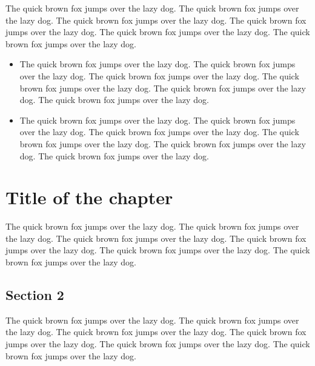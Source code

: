 \documentclass[11pt,a4paper]{report}
\begin{document}
The quick brown fox jumps over the lazy dog. The quick brown fox jumps over the lazy dog. The quick brown fox jumps over the lazy dog. The quick brown fox jumps over the lazy dog. The quick brown fox jumps over the lazy dog. The quick brown fox jumps over the lazy dog.

\begin{itemize}
    \item The quick brown fox jumps over the lazy dog. The quick brown fox jumps over the lazy dog. The quick brown fox jumps over the lazy dog. The quick brown fox jumps over the lazy dog. The quick brown fox jumps over the lazy dog. The quick brown fox jumps over the lazy dog.
    \item The quick brown fox jumps over the lazy dog. The quick brown fox jumps over the lazy dog. The quick brown fox jumps over the lazy dog. The quick brown fox jumps over the lazy dog. The quick brown fox jumps over the lazy dog. The quick brown fox jumps over the lazy dog.
\end{itemize}

\chapter{Title of the chapter}
\label{cap:name2}

The quick brown fox jumps over the lazy dog. The quick brown fox jumps over the lazy dog. The quick brown fox jumps over the lazy dog. The quick brown fox jumps over the lazy dog. The quick brown fox jumps over the lazy dog. The quick brown fox jumps over the lazy dog.

\section{Section 2}
\label{sec:sec2}

The quick brown fox jumps over the lazy dog. The quick brown fox jumps over the lazy dog. The quick brown fox jumps over the lazy dog. The quick brown fox jumps over the lazy dog. The quick brown fox jumps over the lazy dog. The quick brown fox jumps over the lazy dog.


\printbibliography[title={References}]
\end{document}
